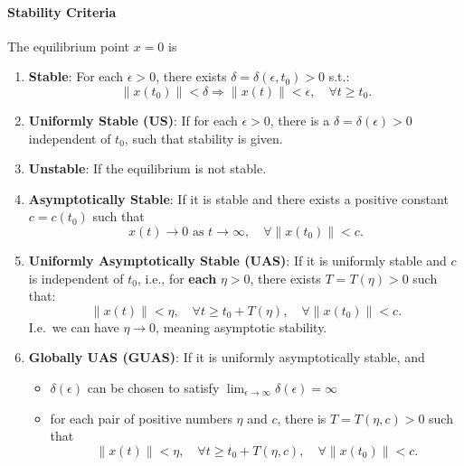 \paragraph{Stability Criteria}
The equilibrium point $x=0$ is
\begin{enumerate}
    \item \textbf{Stable}: For each $\epsilon > 0$, there exists $\delta = \delta(\epsilon, t_0) > 0$ s.t.:
          \noindent\begin{equation*}
              \|x(t_0)\| < \delta \Rightarrow \|x(t)\| < \epsilon, \quad \forall t \geq t_0.
          \end{equation*}
    \item \textbf{Uniformly Stable (US)}: If for each $\epsilon > 0$, there is a $\delta = \delta(\epsilon)>0$ independent of $t_0$, such that stability is given.
    \item \textbf{Unstable}: If the equilibrium is not stable.
    \item \textbf{Asymptotically Stable}: If it is stable and there exists a positive constant $c = c(t_0)$ such that
          \begin{equation*}
              x(t) \to 0 \text{ as } t \to \infty, \quad \forall \|x(t_0)\| < c.
          \end{equation*}
    \item \textbf{Uniformly Asymptotically Stable (UAS)}: If it is uniformly stable and $c$ is independent of $t_0$, i.e., for \textbf{each} $\eta > 0$, there exists $T = T(\eta) > 0$ such that:
          \noindent\begin{equation*}
              \|x(t)\| < \eta, \quad \forall t \geq t_0 + T(\eta), \quad \forall \|x(t_0)\| < c.
          \end{equation*}
          I.e.\ we can have $\eta \rightarrow 0$, meaning asymptotic stability.
    \item \textbf{Globally UAS (GUAS)}: If it is uniformly asymptotically stable, and
          \begin{itemize}
              \item $\delta(\epsilon)$ can be chosen to satisfy $\lim_{\epsilon \rightarrow \infty}\delta(\epsilon)=\infty$
              \item for each pair of positive numbers $\eta$ and $c$, there is $T=T(\eta, c)>0$ such that
                    \noindent\begin{equation*}
                        \|x(t)\| < \eta, \quad \forall t \geq t_0 + T(\eta, c), \quad \forall \|x(t_0)\| < c.
                    \end{equation*}
          \end{itemize}
\end{enumerate}

